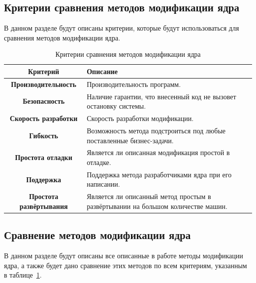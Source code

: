 \subsection{Критерии сравнения методов модификации ядра}\label{sec:----}
В данном разделе будут описаны критерии, которые будут использоваться для сравнения методов модификации ядра.

\begin{table}[ht]
\begin{center}
    \begin{threeparttable}
      \captionsetup{justification=raggedright,singlelinecheck=off}
      \caption{\label{tab:criteria}Критерии сравнения методов модификации ядра}
        \begin{tabular}{|c|p{8cm}|}
        \hline
        \textbf{Критерий} & \textbf{Описание} \\ \hline
        \textbf{Производительность} & Производительность программ. \\ \hline
        \textbf{Безопасность} & Наличие гарантии, что внесенный код не вызовет остановку системы. \\ \hline
        \textbf{Скорость разработки} & Скорость разработки модификации. \\ \hline
        \textbf{Гибкость} & Возможность метода подстроиться под любые поставленные бизнес-задачи. \\ \hline
        \textbf{Простота отладки} & Является ли описанная модификация простой в отладке. \\ \hline
        \textbf{Поддержка} & Поддержка метода разработчиками ядра при его написании. \\ \hline
        \textbf{Простота развёртывания} & Является ли описанный метод простым в развёртывании на большом количестве машин. \\ \hline
        \end{tabular}
    \end{threeparttable}
\end{center}
\end{table}
\newpage
\subsection{Сравнение методов модификации ядра}\label{sec:---}
В данном разделе будут описаны все описанные в работе методы модификации ядра, а также будет дано сравнение этих методов по всем критериям, указанным в таблице~\ref{tab:criteria}.

